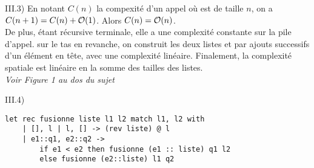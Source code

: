\begin{question}{III.3) }
    En notant $C(n)$ la compexité d'un appel  où  est de taille $n$, on a $C(n+1) = C(n) + \mathcal{O}(1)$. Alors $C(n) = \mathcal{O}(n)$. \\
    De plus,  étant récursive terminale, elle a une complexité constante sur la pile d'appel. sur le tas en revanche, on construit les deux listes  et  par ajouts successifs d'un élément en tête, avec une complexité linéaire. Finalement, la complexité spatiale est linéaire en la somme des tailles des listes. \\ \textit{Voir Figure 1 au dos du sujet}
\end{question}

\begin{question}{III.4) }
    \begin{verbatim}
let rec fusionne liste l1 l2 match l1, l2 with
    | [], l | l, [] -> (rev liste) @ l
    | e1::q1, e2::q2 -> 
        if e1 < e2 then fusionne (e1 :: liste) q1 l2
        else fusionne (e2::liste) l1 q2
    \end{verbatim}
\end{question}

